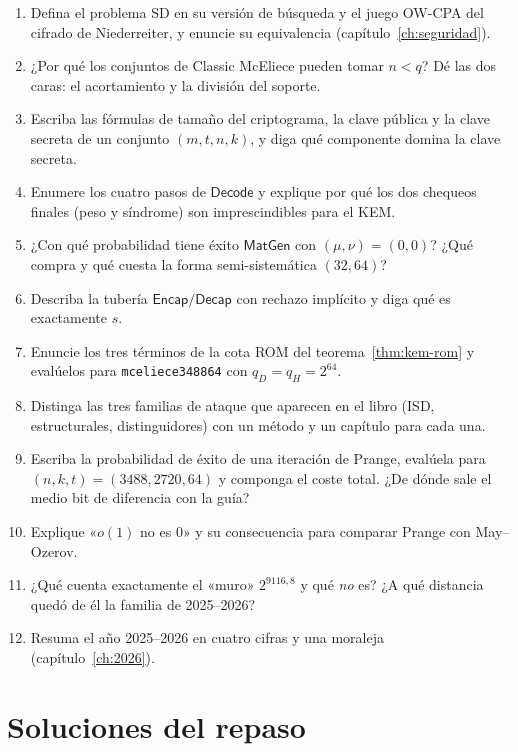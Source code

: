 \begin{enumerate}[leftmargin=1.9em,itemsep=5pt]
  \item Defina el problema SD en su versión de búsqueda y el juego
        OW-CPA del cifrado de Niederreiter, y enuncie su equivalencia
        (capítulo~\ref{ch:seguridad}).
  \item ¿Por qué los conjuntos de Classic McEliece pueden tomar
        $n<q$? Dé las dos caras: el acortamiento y la división del
        soporte.
  \item Escriba las fórmulas de tamaño del criptograma, la clave
        pública y la clave secreta de un conjunto $(m,t,n,k)$, y
        diga qué componente domina la clave secreta.
  \item Enumere los cuatro pasos de $\textsf{Decode}$ y explique por
        qué los dos chequeos finales (peso y síndrome) son
        imprescindibles para el KEM.
  \item ¿Con qué probabilidad tiene éxito $\textsf{MatGen}$ con
        $(\mu,\nu)=(0,0)$? ¿Qué compra y qué cuesta la forma
        semi-sistemática $(32,64)$?
  \item Describa la tubería $\textsf{Encap}/\textsf{Decap}$ con
        rechazo implícito y diga qué es exactamente $s$.
  \item Enuncie los tres términos de la cota ROM del
        teorema~\ref{thm:kem-rom} y evalúelos para
        \texttt{mceliece348864} con $q_D=q_H=2^{64}$.
  \item Distinga las tres familias de ataque que aparecen en el
        libro (ISD, estructurales, distinguidores) con un método y
        un capítulo para cada una.
  \item Escriba la probabilidad de éxito de una iteración de
        Prange, evalúela para $(n,k,t)=(3488,2720,64)$ y componga
        el coste total. ¿De dónde sale el medio bit de diferencia
        con la guía?
  \item Explique «$o(1)$ no es $0$» y su consecuencia para comparar
        Prange con May--Ozerov.
  \item ¿Qué cuenta exactamente el «muro» $2^{9116{,}8}$ y qué
        \emph{no} es? ¿A qué distancia quedó de él la familia de
        2025--2026?
  \item Resuma el año 2025--2026 en cuatro cifras y una moraleja
        (capítulo~\ref{ch:2026}).
\end{enumerate}

\section{Soluciones del repaso}\label{sec:sol-soluciones}

